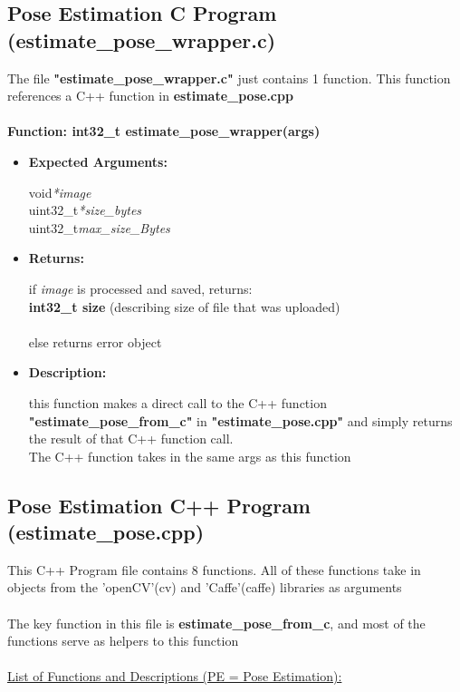 \documentclass{scrreprt}
\begin{document}
\subsection{Pose Estimation C Program (estimate\_pose\_wrapper.c)}
The file \textbf{"estimate\_pose\_wrapper.c"} just contains 1 function. This function references a C++ function in \textbf{estimate\_pose.cpp}
\\\\
\textbf{Function: int32\_t estimate\_pose\_wrapper(args)}
\begin{itemize}
    \item \textbf{Expected Arguments:}

    void\quad\textit{*image}
    \\
    uint32\_t\quad\textit{*size\_bytes}
    \\
    uint32\_t\quad\textit{max\_size\_Bytes}

    \item\quad\textbf{Returns:}

    if \textit{image} is processed and saved, returns:\\\textbf{int32\_t size}
    (describing size of file that was uploaded)
    \\\\
    else returns error object

    \item \textbf{Description:}

    this function makes a direct call to the C++ function \textbf{"estimate\_pose\_from\_c"} in \textbf{"estimate\_pose.cpp"} and simply returns the result of that C++ function call.
    \\
    The C++ function takes in the same args as this function
\end{itemize}

\subsection{Pose Estimation C++ Program (estimate\_pose.cpp)}

This C++ Program file contains 8 functions. All of these functions take in objects from the 'openCV'(cv) and 'Caffe'(caffe) libraries as arguments
\\\\
The key function in this file is \textbf{estimate\_pose\_from\_c}, and most of the functions serve as helpers to this function
\\\\
\underline{List of Functions and Descriptions (PE = Pose Estimation):}
\\
\end{document}
